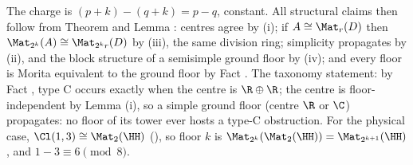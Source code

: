 The charge is $(p{+}k) - (q{+}k) = p - q$, constant. All structural claims then follow from Theorem  and Lemma : centres agree by (i); if $A \cong \Mat_r(D)$ then $\Mat_{2^k}(A) \cong \Mat_{2^k r}(D)$ by (iii), the same division ring; simplicity propagates by (ii), and the block structure of a semisimple ground floor by (iv); and every floor is Morita equivalent to the ground floor by Fact . The taxonomy statement: by Fact , type C occurs exactly when the centre is $\R \oplus \R$; the centre is floor-independent by Lemma (i), so a simple ground floor (centre $\R$ or $\C$) propagates: no floor of its tower ever hosts a type-C obstruction. For the physical case, $\Cl(1,3) \cong \Mat_2(\HH)$ \cite{Porteous1995} (), so floor $k$ is $\Mat_{2^k}(\Mat_2(\HH)) = \Mat_{2^{k+1}}(\HH)$, and $1 - 3 \equiv 6 \pmod 8$.
